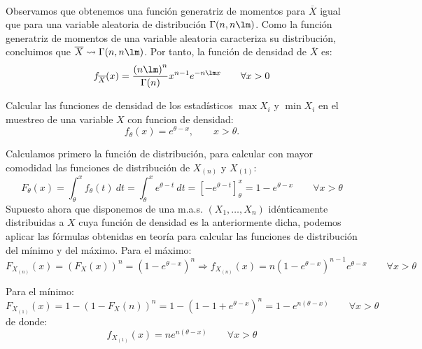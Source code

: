 \begin{ejercicio}
\begin{description}
\begin{align*}
            \end{align*}
            Observamos que obtenemos una función generatriz de momentos para $\overline{X}$ igual que para una variable aleatoria de distribución $\Gamma(n,n\lm)$. Como la función generatriz de momentos de una variable aleatoria caracteriza su distribución, concluimos que $\overline{X}\rightsquigarrow\Gamma(n,n\lm)$. Por tanto, la función de densidad de $\overline{X}$ es:
            \begin{equation*}
                f_{\overline{X}}(x) = \dfrac{{(n\lm)}^{n}}{\Gamma(n)} x^{n-1} e^{-n\lm x} \qquad \forall x>0
            \end{equation*}
    \end{description}
\end{ejercicio}

\begin{ejercicio}
    Calcular las funciones de densidad de los estadísticos $\max X_i$ y $\min X_i$ en el muestreo de una variable $X$ con funcion de densidad:
    \begin{equation*}
        f_\theta(x) = e^{\theta-x}, \qquad x>\theta.
    \end{equation*}

    \noindent
    Calculamos primero la función de distribución, para calcular con mayor comodidad las funciones de distribución de $X_{(n)}$ y $X_{(1)}$:
    \begin{equation*}
        F_\theta(x) = \int_{\theta}^{x} f_\theta(t)~dt = \int_{\theta}^{x} e^{\theta-t}~dt  = \left[-e^{\theta-t}\right]_\theta^x = 1 - e^{\theta - x} \qquad \forall x>\theta
    \end{equation*}
    Supuesto ahora que disponemos de una m.a.s. $(X_1, \ldots, X_n)$ idénticamente distribuidas a $X$ cuya función de densidad es la anteriormente dicha, podemos aplicar las fórmulas obtenidas en teoría para calcular las funciones de distribución del mínimo y del máximo. Para el máximo:
    \begin{equation*}
        F_{X_{(n)}}(x) = {(F_X(x))}^{n} = {(1-e^{\theta-x})}^{n} \Longrightarrow f_{X_{(n)}}(x) = n{(1-e^{\theta - x})}^{n-1}e^{\theta -x} \qquad \forall x>\theta
    \end{equation*}

    Para el mínimo:
    \begin{equation*}
        F_{X_{(1)}}(x) = 1 - {(1-F_X(n))}^{n} = 1-{(1-1+e^{\theta-x})}^{n} = 1-e^{n(\theta-x)} \qquad \forall x>\theta
    \end{equation*}
    de donde:
    \begin{equation*}
        f_{X_{(1)}}(x) = ne^{n(\theta-x)} \qquad \forall x>\theta
    \end{equation*}
\end{ejercicio}

